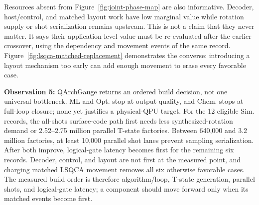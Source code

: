 Resources absent from Figure~\ref{fig:joint-phase-map} are also informative. Decoder, host/control, and matched layout work have low marginal value while rotation supply or shot serialization remains upstream. This is not a claim that they never matter. It says their application-level value must be re-evaluated after the earlier crossover, using the dependency and movement events of the same record. Figure~\ref{fig:lsqca-matched-replacement} demonstrates the converse: introducing a layout mechanism too early can add enough movement to erase every favorable case.

\begin{observationbox}
\noindent\textbf{Observation 5:} QArchGauge returns an ordered build decision, not one universal bottleneck. ML and Opt. stop at output quality, and Chem. stops at full-loop closure; none yet justifies a physical-QPU target. For the 12 eligible Sim. records, the all-shots surface-code path first needs less synthesized-rotation demand or 2.52--2.75 million parallel T-state factories. Between 640,000 and 3.2 million factories, at least 10,000 parallel shot lanes prevent sampling serialization. After both improve, logical-gate latency becomes first for the remaining six records. Decoder, control, and layout are not first at the measured point, and charging matched LSQCA movement removes all six otherwise favorable cases. The measured build order is therefore algorithm/loop, T-state generation, parallel shots, and logical-gate latency; a component should move forward only when its matched events become first.
\end{observationbox}
\FloatBarrier
